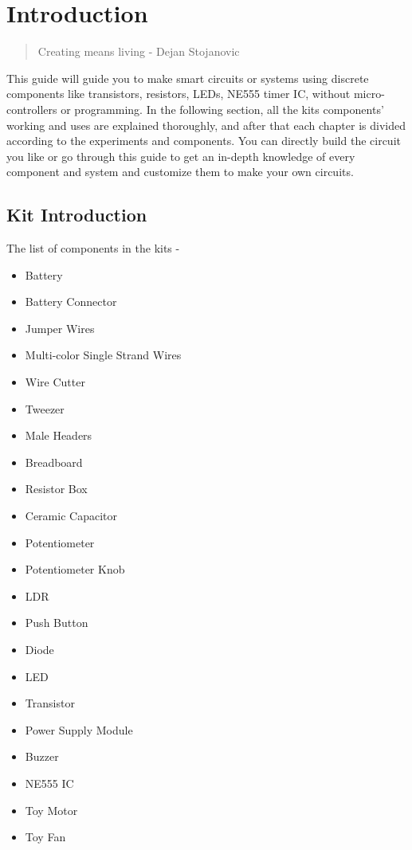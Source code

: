 \cleardoublepage
{} %

\chapter{Introduction}

\begin{quote}
    {\Large Creating means living} - Dejan Stojanovic
\end{quote}
This guide will guide you to make smart circuits or systems using discrete components like transistors, resistors, LEDs, NE555 timer IC, without micro-controllers or programming.
In the following section, all the kits components' working and uses are explained thoroughly, and after that each chapter is divided according to the experiments and components. You can directly build the circuit you like or go through this guide to get an in-depth knowledge of every component and system and customize them to make your own circuits.

\section{Kit Introduction}
The list of components in the kits - 
\begin{itemize}
\item Battery
\item Battery Connector
\item Jumper Wires
\item Multi-color Single Strand Wires
\item Wire Cutter
\item Tweezer
\item Male Headers
\item Breadboard
\item Resistor Box
\item Ceramic Capacitor
\item Potentiometer
\item Potentiometer Knob
\item LDR
\item Push Button
\item Diode
\item LED
\item Transistor
\item Power Supply Module
\item Buzzer
\item NE555 IC
\item Toy Motor
\item Toy Fan
\end{itemize}